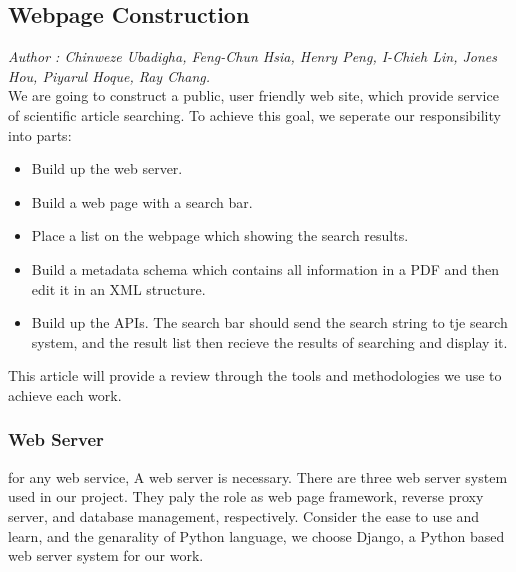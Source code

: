 \subsection{Webpage Construction}
\textit{\footnotesize Author : Chinweze Ubadigha, Feng-Chun Hsia, Henry Peng, I-Chieh Lin, Jones Hou, Piyarul Hoque, Ray Chang.}\\

We are going to construct a public, user friendly web site, which provide service of scientific article searching.
To achieve this goal, we seperate our responsibility into parts:\\
\begin{itemize}
	\item Build up the web server.
	\item Build a web page with a search bar.
	\item Place a list on the webpage which showing the search results.
	\item Build a metadata schema which contains all information in a PDF and then edit it in an XML structure. 
	\item Build up the APIs. The search bar should send the search string to tje search system, and the result list then recieve the results of searching and display it.
\end{itemize}
This article will provide a review through the tools and methodologies we use to achieve each work.
\subsubsection{Web Server}
for any web service, A web server is necessary.
There are three web server system used in our project. They paly the role as web page framework, reverse proxy server, and database management, respectively.
Consider the ease to use and learn, and the genarality of Python language, we choose Django, a Python based web server system for our work.


